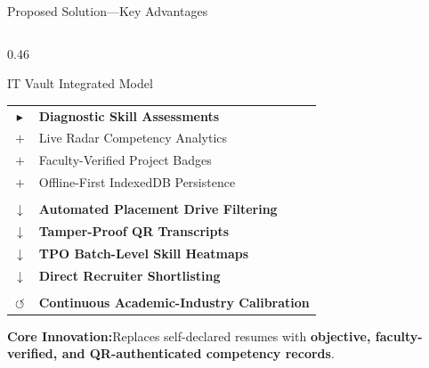 \documentclass[aspectratio=169,10pt,xcolor={table,dvipsnames}]{beamer}
\begin{document}
\begin{frame}[t]{Proposed Solution\enspace---\enspace Key Advantages}
  \begin{columns}[T]
    \begin{column}{0.46\textwidth}
      \begin{navytitlecard}{IT Vault Integrated Model}
        \fontsize{6.5}{7.6}\selectfont
        \renewcommand{\arraystretch}{1.06}
        \begin{tabular}{@{}cl@{}}
          {\color{Navy}$\blacktriangleright$} & \textbf{Diagnostic Skill Assessments}\\
          {\color{Navy}$+$} & Live Radar Competency Analytics\\
          {\color{Navy}$+$} & Faculty-Verified Project Badges\\
          {\color{Navy}$+$} & Offline-First IndexedDB Persistence\\[1pt]
          \hline\\[-6pt]
          {\color{Navy}$\downarrow$} & \textbf{Automated Placement Drive Filtering}\\
          {\color{Navy}$\downarrow$} & \textbf{Tamper-Proof QR Transcripts}\\
          {\color{Navy}$\downarrow$} & \textbf{TPO Batch-Level Skill Heatmaps}\\
          {\color{Navy}$\downarrow$} & \textbf{Direct Recruiter Shortlisting}\\[1pt]
          \hline\\[-6pt]
          {\color{Navy}$\circlearrowleft$} & \textbf{Continuous Academic-Industry Calibration}
        \end{tabular}
      \end{navytitlecard}
      \vspace{0.04cm}
      \begin{tcolorbox}[
        enhanced,colback=LightSilver,colframe=BorderColor,
        arc=2pt,boxrule=0.6pt,
        left=4pt,right=4pt,top=2pt,bottom=2pt]
        \fontsize{6.2}{7.4}\selectfont\color{Navy}
        \textbf{Core Innovation:}\;Replaces self-declared resumes with \textbf{objective, faculty-verified, and QR-authenticated competency records}.
      \end{tcolorbox}
    \end{column}


\end{columns}
\end{frame}
\end{document}
